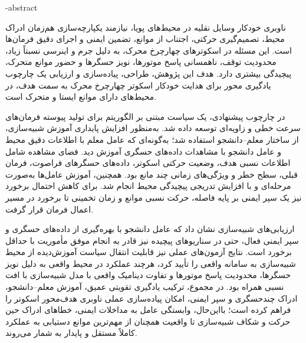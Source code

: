 \fa-abstract{
ناوبری خودکار وسایل نقلیه در محیط‌های پویا، نیازمند یکپارچه‌سازی هم‌زمان ادراک محیط، تصمیم‌گیری حرکتی، اجتناب از موانع، تضمین ایمنی و اجرای دقیق فرمان‌ها است. این مسئله در اسکوترهای چهارچرخ محرک، به دلیل جرم و اینرسی نسبتاً زیاد، محدودیت توقف، ناهمسانی پاسخ موتورها، نویز حسگرها و حضور موانع متحرک، پیچیدگی بیشتری دارد. هدف این پژوهش، طراحی، پیاده‌سازی و ارزیابی یک چارچوب یادگیری‌ محور برای هدایت خودکار اسکوتر چهارچرخ محرک به سمت هدف، در محیط‌های دارای موانع ایستا و متحرک است.

در چارچوب پیشنهادی، یک سیاست مبتنی بر الگوریتم  برای تولید پیوسته فرمان‌های سرعت خطی و زاویه‌ای توسعه داده شد. به‌منظور افزایش پایداری آموزش شبیه‌سازی، از ساختار معلم--دانشجو استفاده شد؛ به‌گونه‌ای که عامل معلم با اطلاعات دقیق محیط و عامل دانشجو با مشاهدات داده‌های حسگری آموزش دید. فضای مشاهده شامل اطلاعات نسبی هدف، وضعیت حرکتی اسکوتر، داده‌های حسگرهای فراصوت، فرمان قبلی، سطح خطر و ویژگی‌های زمانی چند مانع بود. همچنین، آموزش عامل‌ها به‌صورت مرحله‌ای و با افزایش تدریجی پیچیدگی محیط انجام شد. برای کاهش احتمال برخورد نیز یک سپر ایمنی بر پایه فاصله، حرکت نسبی موانع و زمان تخمینی تا برخورد در مسیر اعمال فرمان قرار گرفت.

ارزیابی‌های شبیه‌سازی نشان داد که عامل دانشجو با بهره‌گیری از داده‌های حسگری و سپر ایمنی فعال، حتی در سناریوهای پیچیده نیز قادر به انجام موفق مأموریت با حداقل برخورد است. نتایج آزمون‌های عملی نیز قابلیت انتقال سیاست آموزش‌دیده از محیط شبیه‌سازی به سامانه واقعی را تأیید کرد، هرچند عملکرد در محیط واقعی به دلیل نویز حسگرها، محدودیت پاسخ موتورها و تفاوت دینامیک واقعی با مدل شبیه‌سازی با افت نسبی همراه بود. در مجموع، ترکیب یادگیری تقویتی عمیق، آموزش معلم--دانشجو، ادراک چندحسگری و سپر ایمنی، امکان پیاده‌سازی عملی ناوبری هدف‌محور اسکوتر را فراهم کرده است؛ بااین‌حال، وابستگی عامل به مداخلات ایمنی، خطاهای ادراک حین حرکت و شکاف شبیه‌سازی تا واقعیت همچنان از مهم‌ترین موانع دستیابی به عملکرد کاملاً مستقل و پایدار به شمار می‌روند.

}
